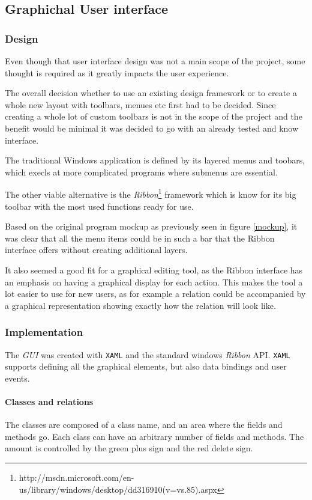 \subsection{Graphichal User interface}

\subsubsection{Design}

Even though that
user interface design was not a main scope of the project, some thought is
required as it greatly impacts the user experience. 

The overall decision whether to use an existing design
framework or to create a whole new layout with toolbars, menues etc first had to
be decided. Since creating a whole lot of custom toolbars
is not in the scope of the project and the benefit would be minimal it was
decided to go with an already tested and know interface. 

The traditional Windows application is defined by its layered menus and toobars,
which execls at more complicated programs where submenus are essential.

The other viable alternative is the
\textit{Ribbon}\footnote{http://msdn.microsoft.com/en-us/library/windows/desktop/dd316910(v=vs.85).aspx}
framework which is know for its big toolbar with the most used functions ready
for use.

Based on the original program mockup as previously seen in figure \ref{mockup},
it was clear that all the menu items could be in such a bar that the Ribbon
interface offers without creating additional layers.

It also seemed a good fit for a graphical editing tool, as the Ribbon interface
has an emphasis on having a graphical display for each action. This makes the
tool a lot easier to use for new users, as for example a relation could be
accompanied by a graphical representation showing exactly how the relation will
look like.

\subsubsection{Implementation} 
The \textit{GUI} was created with \texttt{XAML} and the standard windows
\textit{Ribbon} API. \texttt{XAML} supports defining all the graphical elements,
but also data bindings and user events.

\paragraph{Classes and relations}
The classes are composed of a class name, and an area where the
fields and methods go. Each class can have an arbitrary number of fields and
methods. The
amount is controlled by the green plus sign and the red delete sign.

